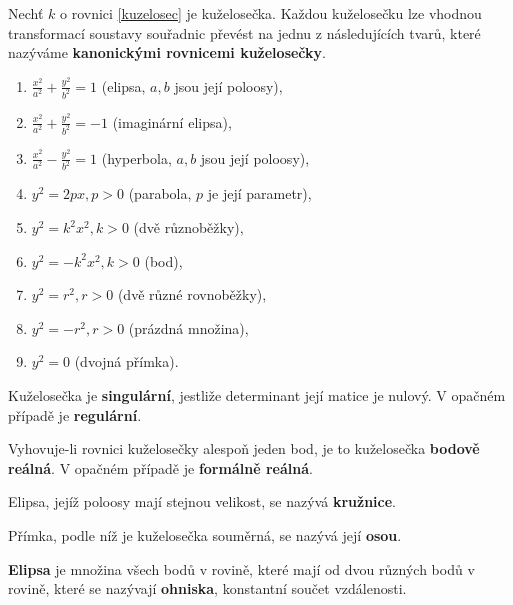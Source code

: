 \begin{definition}
    Nechť $k$ o rovnici \ref{kuzelosec} je kuželosečka. Každou kuželosečku lze
    vhodnou transformací soustavy souřadnic převést na jednu z následujících
    tvarů, které nazýváme \textbf{kanonickými rovnicemi kuželosečky}.
    \begin{enumerate}[$i.$]
    \item $\frac{x^2}{a^2} + \frac{y^2}{b^2}=1$ (elipsa, $a,b$ jsou její poloosy),
   	\item $\frac{x^2}{a^2} + \frac{y^2}{b^2}=-1$ (imaginární elipsa),
   	\item $\frac{x^2}{a^2} - \frac{y^2}{b^2}=1$ (hyperbola, $a,b$ jsou její poloosy),
   	\item $y^2=2px, p>0$ (parabola, $p$ je její parametr),
   	\item $y^2 = k^2x^2, k>0$ (dvě různoběžky),
   	\item $y^2 = -k^2x^2, k>0$ (bod),
   	\item $y^2 = r^2, r>0$ (dvě různé rovnoběžky),
   	\item $y^2 = -r^2, r>0$ (prázdná množina),
   	\item $y^2=0$ (dvojná přímka).
    \end{enumerate}
\end{definition}

\begin{definition}
    Kuželosečka je \textbf{singulární}, jestliže determinant její matice je nulový.
    V opačném případě je \textbf{regulární}.
\end{definition}

\begin{definition}
    Vyhovuje-li rovnici kuželosečky alespoň jeden bod, je to kuželosečka
    \textbf{bodově reálná}. V opačném případě je \textbf{formálně reálná}.
\end{definition}

\begin{definition}
    Elipsa, jejíž poloosy mají stejnou velikost, se nazývá \textbf{kružnice}.
\end{definition}

\begin{definition}
    Přímka, podle níž je kuželosečka souměrná, se nazývá její \textbf{osou}.
\end{definition}

\begin{definition}
\textbf{Elipsa} je množina všech bodů v rovině, které mají od dvou různých bodů v rovině,
které se nazývají \textbf{ohniska}, konstantní součet vzdálenosti.
\end{definition}

